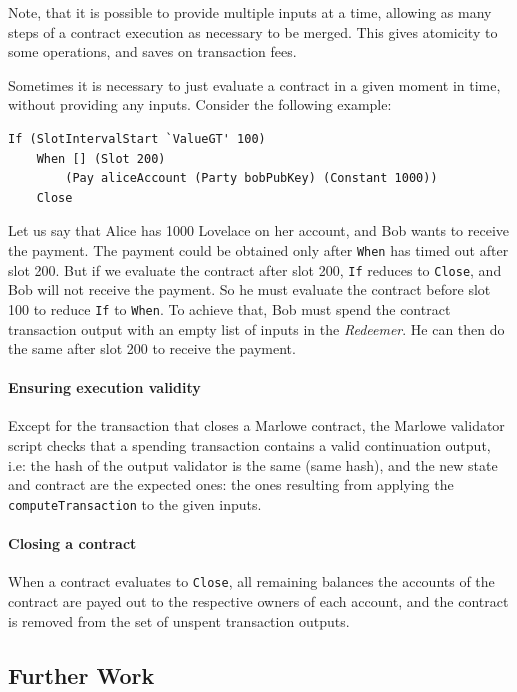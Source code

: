 \documentclass[runningheads]{llncs}
\begin{document}
Note, that it is possible to provide multiple inputs at a time,
allowing as many steps of a contract execution as necessary to be merged.
This gives atomicity to some operations, and saves on transaction fees.

Sometimes it is necessary to just evaluate a contract in a given moment in time,
without providing any inputs. Consider the following example:

\begin{verbatim}
If (SlotIntervalStart `ValueGT' 100)
    When [] (Slot 200)
        (Pay aliceAccount (Party bobPubKey) (Constant 1000))
    Close
\end{verbatim}

Let us say that Alice has 1000 Lovelace on her account, and Bob wants to receive the payment.
The payment could be obtained only after \texttt{When} has timed out after slot 200.
But if we evaluate the contract after slot 200, \texttt{If} reduces to \texttt{Close}, and
Bob will not receive the payment. So he must evaluate the contract before slot 100 to
reduce \texttt{If} to \texttt{When}.
To achieve that, Bob must spend the contract transaction output with an empty list of inputs in the \emph{Redeemer}.
He can then do the same after slot 200 to receive the payment.

\paragraph{Ensuring execution validity}

Except for the transaction that closes a Marlowe contract, the Marlowe validator script checks that a spending transaction contains a valid continuation
output, i.e: the hash of the output validator is the same (same hash), and the new state and contract are the expected ones: the ones resulting from applying the \texttt{computeTransaction} to the given inputs.

\paragraph{Closing a contract}

When a contract evaluates to \texttt{Close}, all remaining balances the accounts of the contract are payed out
to the respective owners of each account, and the contract is removed from the set of unspent transaction outputs.

\subsection{Further Work}
\end{document}
